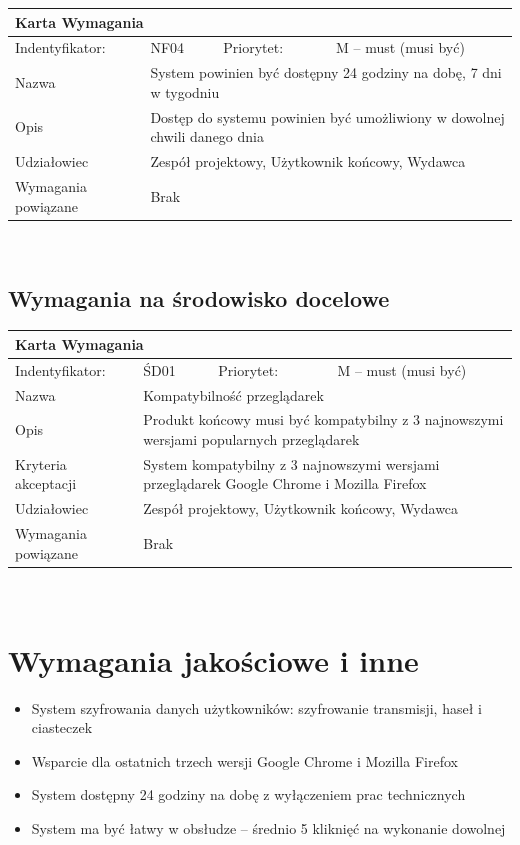 \documentclass[a4paper,11pt]{report}
\begin{document}
		\begin{tabular}{|p{3cm}|p{2cm}|p{2cm}|p{6cm}|}
		\hline
		\multicolumn{4}{|p{12 cm}|}{Karta Wymagania}\\
		\hline
		Indentyfikator: & NF04 & Priorytet: & M – must (musi być)\\
		\hline
		Nazwa & \multicolumn{3}{|p{10 cm}|}{System powinien być dostępny 24 godziny na dobę, 7 dni w tygodniu}\\
		\hline
		Opis & \multicolumn{3}{|p{10 cm}|}{Dostęp do systemu powinien być umożliwiony w dowolnej chwili danego dnia}\\
		\hline
		Udziałowiec & \multicolumn{3}{|p{10 cm}|}{Zespół projektowy, Użytkownik końcowy, Wydawca}\\
		\hline
		Wymagania powiązane & \multicolumn{3}{|p{10 cm}|}{Brak}\\
		\hline
		\end{tabular}\\
	\subsection {Wymagania na środowisko docelowe}
	\begin{tabular}{|p{3cm}|p{2cm}|p{2cm}|p{6cm}|}
		\hline
		\multicolumn{4}{|p{12 cm}|}{Karta Wymagania}\\
		\hline
		Indentyfikator: & ŚD01 & Priorytet: & M – must (musi być)\\
		\hline
		Nazwa & \multicolumn{3}{|p{10 cm}|}{Kompatybilność przeglądarek}\\
		\hline
		Opis & \multicolumn{3}{|p{10 cm}|}{Produkt końcowy musi być kompatybilny z 3 najnowszymi wersjami popularnych przeglądarek}\\
		\hline
		Kryteria akceptacji & \multicolumn{3}{|p{10 cm}|}{System kompatybilny z 3 najnowszymi wersjami przeglądarek Google Chrome i Mozilla Firefox}\\
		\hline
		Udziałowiec & \multicolumn{3}{|p{10 cm}|}{Zespół projektowy, Użytkownik końcowy, Wydawca}\\
		\hline
		Wymagania powiązane & \multicolumn{3}{|p{10 cm}|}{Brak}\\
		\hline
		\end{tabular}\\
	\section {Wymagania jakościowe i inne}
	\begin{itemize}
		\item System szyfrowania danych użytkowników: szyfrowanie transmisji, haseł i ciasteczek
		\item Wsparcie dla ostatnich trzech wersji Google Chrome i Mozilla Firefox
		\item System dostępny 24 godziny na dobę z wyłączeniem prac technicznych
		\item System ma być łatwy w obsłudze – średnio 5 kliknięć na wykonanie dowolnej 
	\end{itemize}
\end{document}
